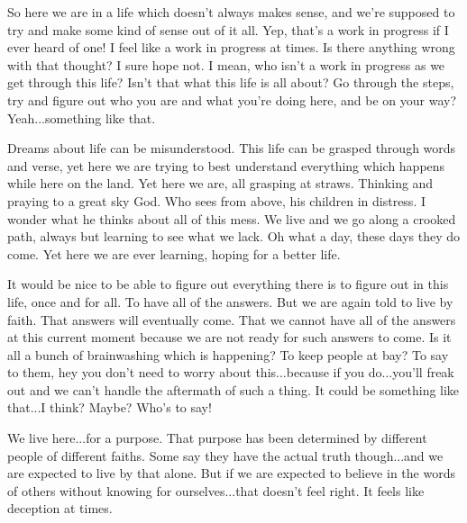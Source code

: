 So here we are in a life which doesn't always makes sense, and we're supposed to
try and make some kind of sense out of it all. Yep, that's a work in progress if
I ever heard of one! I feel like a work in progress at times. Is there anything
wrong with that thought? I sure hope not. I mean, who isn't a work in progress
as we get through this life? Isn't that what this life is all about? Go through
the steps, try and figure out who you are and what you're doing here, and be on
your way? Yeah...something like that.

Dreams about life can be misunderstood. This life can be grasped through words
and verse, yet here we are trying to best understand everything which happens
while here on the land. Yet here we are, all grasping at straws. Thinking and
praying to a great sky God. Who sees from above, his children in distress. I
wonder what he thinks about all of this mess. We live and we go along a crooked
path, always but learning to see what we lack. Oh what a day, these days they do
come. Yet here we are ever learning, hoping for a better life.

It would be nice to be able to figure out everything there is to figure out in
this life, once and for all. To have all of the answers. But we are again told
to live by faith. That answers will eventually come. That we cannot have all of
the answers at this current moment because we are not ready for such answers to
come. Is it all a bunch of brainwashing which is happening? To keep people at
bay? To say to them, hey you don't need to worry about this...because if you
do...you'll freak out and we can't handle the aftermath of such a thing. It
could be something like that...I think? Maybe? Who's to say!

We live here...for a purpose. That purpose has been determined by different
people of different faiths. Some say they have the actual truth though...and we
are expected to live by that alone. But if we are expected to believe in the
words of others without knowing for ourselves...that doesn't feel right. It
feels like deception at times.

